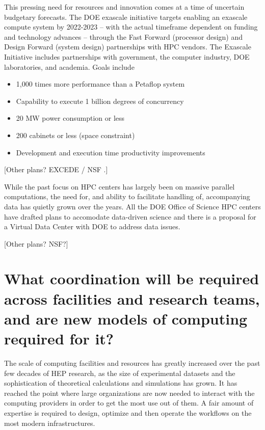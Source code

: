 This pressing need for resources and innovation comes at a time of uncertain budgetary forecasts. The DOE exascale initiative targets enabling an exascale compute system by 2022-2023 -- with the actual timeframe dependent on funding and technology advances -- through the Fast Forward (processor design) and Design Forward (system design) partnerships with HPC vendors. The Exascale Initiative includes partnerships with government, the computer industry, DOE laboratories, and academia.  Goals include
\begin{itemize}
\item{1,000 times more performance than a Petaflop system}
\item{Capability to execute 1 billion degrees of concurrency}
\item{20 MW power consumption or less}
\item{200 cabinets or less (space constraint)}
\item{Development and execution time productivity improvements}
\end{itemize}
 
[Other plans? EXCEDE / NSF .]
 
 
While the past focus on HPC centers has largely been on massive parallel computations, the need for, and ability to facilitate handling of, accompanying data has quietly grown over the years. 
All the DOE Office of Science HPC centers have drafted plans to accomodate data-driven science and 
there is a proposal for a Virtual Data Center with DOE to address data issues. 

[Other plans? NSF?]

\section{What coordination will be required across facilities and research teams, and are new models of computing required for it?}


The scale of computing facilities and resources has greatly increased over the past few decades of HEP research, as the size of experimental datasets and the sophistication of theoretical calculations and simulations has grown.  It has reached the point where large organizations are now needed to interact with the computing providers in order to get the most use out of them.  A fair amount of expertise is required to design, optimize and then operate the workflows on the most modern infrastructures.

